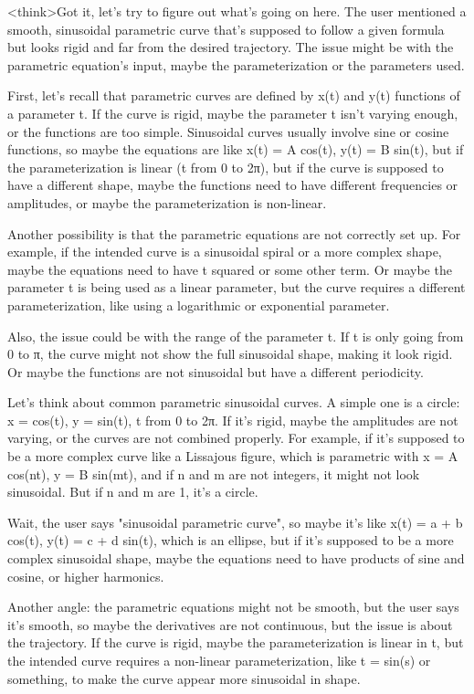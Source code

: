<think>Got it, let's try to figure out what's going on here. The user mentioned a smooth, sinusoidal parametric curve that's supposed to follow a given formula but looks rigid and far from the desired trajectory. The issue might be with the parametric equation's input, maybe the parameterization or the parameters used.

First, let's recall that parametric curves are defined by x(t) and y(t) functions of a parameter t. If the curve is rigid, maybe the parameter t isn't varying enough, or the functions are too simple. Sinusoidal curves usually involve sine or cosine functions, so maybe the equations are like x(t) = A cos(t), y(t) = B sin(t), but if the parameterization is linear (t from 0 to 2π), but if the curve is supposed to have a different shape, maybe the functions need to have different frequencies or amplitudes, or maybe the parameterization is non-linear.

Another possibility is that the parametric equations are not correctly set up. For example, if the intended curve is a sinusoidal spiral or a more complex shape, maybe the equations need to have t squared or some other term. Or maybe the parameter t is being used as a linear parameter, but the curve requires a different parameterization, like using a logarithmic or exponential parameter.

Also, the issue could be with the range of the parameter t. If t is only going from 0 to π, the curve might not show the full sinusoidal shape, making it look rigid. Or maybe the functions are not sinusoidal but have a different periodicity.

Let's think about common parametric sinusoidal curves. A simple one is a circle: x = cos(t), y = sin(t), t from 0 to 2π. If it's rigid, maybe the amplitudes are not varying, or the curves are not combined properly. For example, if it's supposed to be a more complex curve like a Lissajous figure, which is parametric with x = A cos(nt), y = B sin(mt), and if n and m are not integers, it might not look sinusoidal. But if n and m are 1, it's a circle.

Wait, the user says "sinusoidal parametric curve", so maybe it's like x(t) = a + b cos(t), y(t) = c + d sin(t), which is an ellipse, but if it's supposed to be a more complex sinusoidal shape, maybe the equations need to have products of sine and cosine, or higher harmonics.

Another angle: the parametric equations might not be smooth, but the user says it's smooth, so maybe the derivatives are not continuous, but the issue is about the trajectory. If the curve is rigid, maybe the parameterization is linear in t, but the intended curve requires a non-linear parameterization, like t = sin(s) or something, to make the curve appear more sinusoidal in shape.

